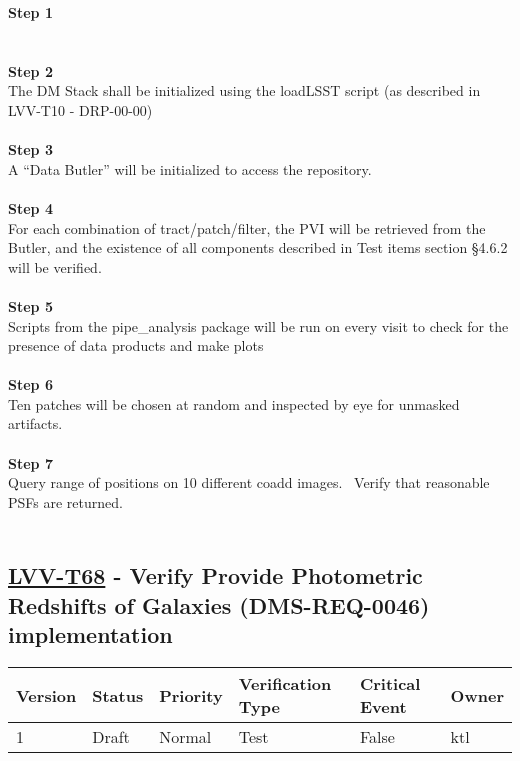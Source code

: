 \textbf{Step 1}\\
~\\
~\\
\textbf{Step 2}\\
The DM Stack shall be initialized using the loadLSST script (as
described in LVV-T10 - DRP-00-00)\\
~\\
\textbf{Step 3}\\
A ``Data Butler'' will be initialized to access the repository.\\
~\\
\textbf{Step 4}\\
For each combination of tract/patch/filter, the PVI will be retrieved
from the Butler, and the existence of all components described in Test
items section §4.6.2 will be verified.\\
~\\
\textbf{Step 5}\\
Scripts from the pipe\_analysis package will be run on every visit to
check for the presence of data products and make plots\\
~\\
\textbf{Step 6}\\
Ten patches will be chosen at random and inspected by eye for unmasked
artifacts.\\
~\\
\textbf{Step 7}\\
Query range of positions on 10 different coadd images. ~Verify that
reasonable PSFs are returned.\\
~\\

\hypertarget{lvv-t68---verify-provide-photometric-redshifts-of-galaxies-dms-req-0046-implementation}{%
\subsection{\texorpdfstring{\href{https://jira.lsstcorp.org/secure/Tests.jspa\#/testCase/LVV-T68}{LVV-T68}
- Verify Provide Photometric Redshifts of Galaxies (DMS-REQ-0046)
implementation}{LVV-T68 - Verify Provide Photometric Redshifts of Galaxies (DMS-REQ-0046) implementation}}\label{lvv-t68---verify-provide-photometric-redshifts-of-galaxies-dms-req-0046-implementation}}

\begin{longtable}[]{@{}llllll@{}}
\toprule
Version & Status & Priority & Verification Type & Critical Event &
Owner\tabularnewline
\midrule
\endhead
1 & Draft & Normal & Test & False & ktl\tabularnewline
\bottomrule
\end{longtable}

